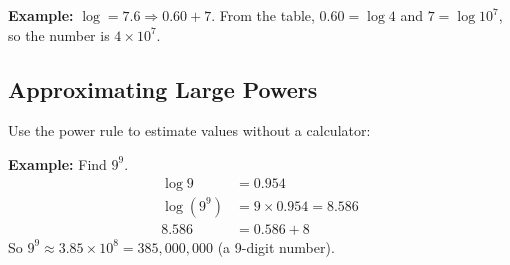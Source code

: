 \documentclass{article}
\begin{document}
\textbf{Example:} $\log = 7.6 \Rightarrow 0.60 + 7$. From the table, $0.60 = \log 4$ and $7 = \log 10^7$, so the number is $4 \times 10^7$.

\subsection*{Approximating Large Powers}

Use the power rule to estimate values without a calculator:

\medbreak
\textbf{Example:} Find $9^9$.
\begin{align*}
    \log 9 &= 0.954 \\
    \log(9^9) &= 9 \times 0.954 = 8.586 \\
    8.586 &= 0.586 + 8
\end{align*}
So $9^9 \approx 3.85 \times 10^8 = 385{,}000{,}000$ (a 9-digit number).
\end{document}
